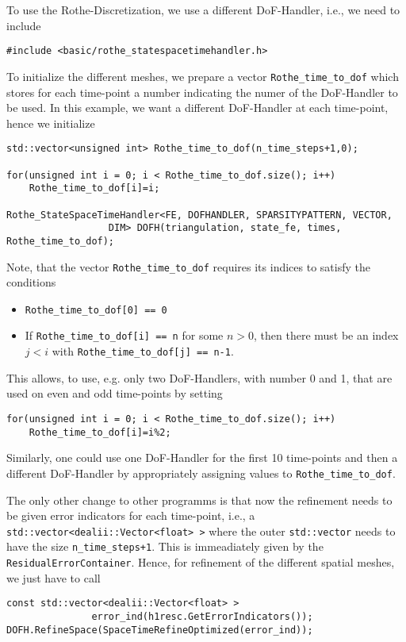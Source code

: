 To use the Rothe-Discretization, we use a different DoF-Handler, i.e.,
we need to include
\begin{verbatim}
#include <basic/rothe_statespacetimehandler.h>
\end{verbatim}
To initialize the different meshes, we prepare a vector
\texttt{Rothe\_time\_to\_dof} which stores for each time-point a number
indicating the numer of the DoF-Handler to be used. In this example,
we want a different DoF-Handler at each time-point, hence we
initialize
\begin{verbatim}
std::vector<unsigned int> Rothe_time_to_dof(n_time_steps+1,0);

for(unsigned int i = 0; i < Rothe_time_to_dof.size(); i++)
    Rothe_time_to_dof[i]=i;

Rothe_StateSpaceTimeHandler<FE, DOFHANDLER, SPARSITYPATTERN, VECTOR,
			      DIM> DOFH(triangulation, state_fe, times, Rothe_time_to_dof);
\end{verbatim}
Note, that the vector \texttt{Rothe\_time\_to\_dof} requires its indices
to satisfy the conditions
\begin{itemize}
\item \verb|Rothe_time_to_dof[0] == 0|
\item If \verb|Rothe_time_to_dof[i] == n| for some $n > 0$, then there
  must be an index $j < i$ with \verb|Rothe_time_to_dof[j] == n-1|. 
\end{itemize}
This allows, to use, e.g. only two DoF-Handlers, with number 0 and 1,
that are used on even and odd time-points by setting 
\begin{verbatim}
for(unsigned int i = 0; i < Rothe_time_to_dof.size(); i++)
    Rothe_time_to_dof[i]=i%2;
\end{verbatim}
Similarly, one could use one DoF-Handler for the first 10 time-points
and then a different DoF-Handler by appropriately assigning values to \texttt{Rothe\_time\_to\_dof}.

The only other change to other programms is that now the refinement
needs to be given error indicators for each time-point, i.e., a
\verb|std::vector<dealii::Vector<float> >| where the outer
\texttt{std::vector} needs to have the size \texttt{n\_time\_steps+1}.
This is immeadiately given by the
\texttt{ResidualErrorContainer}. Hence, for refinement of the
different spatial meshes, we just have to call
\begin{verbatim}
const std::vector<dealii::Vector<float> > 
               error_ind(h1resc.GetErrorIndicators());
DOFH.RefineSpace(SpaceTimeRefineOptimized(error_ind));
\end{verbatim}
